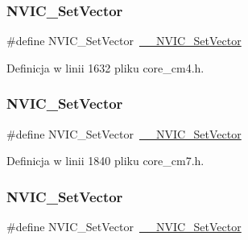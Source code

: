 \subsubsection{\texorpdfstring{N\+V\+I\+C\+\_\+\+Set\+Vector}{NVIC\_SetVector}\hspace{0.1cm}{\footnotesize\ttfamily [9/12]}}
{\footnotesize\ttfamily \#define N\+V\+I\+C\+\_\+\+Set\+Vector~\hyperlink{group___c_m_s_i_s___core___n_v_i_c_functions_ga0df355460bc1783d58f9d72ee4884208}{\+\_\+\+\_\+\+N\+V\+I\+C\+\_\+\+Set\+Vector}}



Definicja w linii 1632 pliku core\+\_\+cm4.\+h.

\mbox{\label{group___c_m_s_i_s___core___n_v_i_c_functions_ga804af63bb4c4c317387897431814775d}} 
\subsubsection{\texorpdfstring{N\+V\+I\+C\+\_\+\+Set\+Vector}{NVIC\_SetVector}\hspace{0.1cm}{\footnotesize\ttfamily [10/12]}}
{\footnotesize\ttfamily \#define N\+V\+I\+C\+\_\+\+Set\+Vector~\hyperlink{group___c_m_s_i_s___core___n_v_i_c_functions_ga0df355460bc1783d58f9d72ee4884208}{\+\_\+\+\_\+\+N\+V\+I\+C\+\_\+\+Set\+Vector}}



Definicja w linii 1840 pliku core\+\_\+cm7.\+h.

\mbox{\label{group___c_m_s_i_s___core___n_v_i_c_functions_ga804af63bb4c4c317387897431814775d}} 
\subsubsection{\texorpdfstring{N\+V\+I\+C\+\_\+\+Set\+Vector}{NVIC\_SetVector}\hspace{0.1cm}{\footnotesize\ttfamily [11/12]}}
{\footnotesize\ttfamily \#define N\+V\+I\+C\+\_\+\+Set\+Vector~\hyperlink{group___c_m_s_i_s___core___n_v_i_c_functions_ga0df355460bc1783d58f9d72ee4884208}{\+\_\+\+\_\+\+N\+V\+I\+C\+\_\+\+Set\+Vector}}




